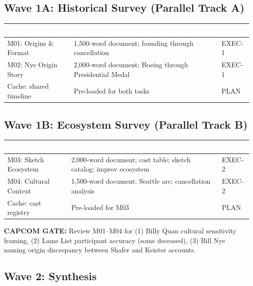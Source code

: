 \documentclass[11pt,letterpaper]{article}
\newcommand{\tableheader}[1]{\textbf{\sffamily\textcolor{white}{#1}}}
\begin{document}
\subsection{Wave 1A: Historical Survey (Parallel Track A)}

\begin{center}
\begin{tabularx}{\textwidth}{L{3.5cm}XC{2cm}}
\toprule
{}
\tableheader{Task} & \tableheader{Output} & \tableheader{Agent} \\
\midrule
M01: Origins \& Format & 1,500-word document; founding through cancellation & EXEC-1 \\
M02: Nye Origin Story & 2,000-word document; Boeing through Presidential Medal & EXEC-1 \\
Cache: shared timeline & Pre-loaded for both tasks & PLAN \\
\bottomrule
\end{tabularx}
\end{center}

\subsection{Wave 1B: Ecosystem Survey (Parallel Track B)}

\begin{center}
\begin{tabularx}{\textwidth}{L{3.5cm}XC{2cm}}
\toprule
{}
\tableheader{Task} & \tableheader{Output} & \tableheader{Agent} \\
\midrule
M03: Sketch Ecosystem & 2,000-word document; cast table; sketch catalog; improv ecosystem & EXEC-2 \\
M04: Cultural Context & 1,500-word document; Seattle arc; cancellation analysis & EXEC-2 \\
Cache: cast registry & Pre-loaded for M03 & PLAN \\
\bottomrule
\end{tabularx}
\end{center}

\textbf{CAPCOM GATE:} Review M01--M04 for (1) Billy Quan cultural sensitivity framing, (2) Lame List participant accuracy (some deceased), (3) Bill Nye naming origin discrepancy between Shafer and Keister accounts.

\subsection{Wave 2: Synthesis}
\end{document}
